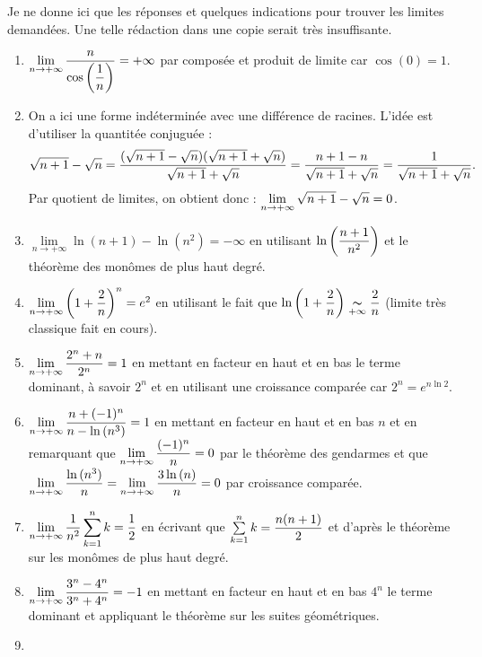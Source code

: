 \documentclass[a4paper, 11pt]{article}
\begin{document}
\begin{correction} \;
Je ne donne ici que les r\'eponses et quelques indications pour trouver les limites demand\'ees. Une telle r\'edaction dans une copie serait tr\`es insuffisante.
\begin{enumerate}
\item
$\lim \limits_{n\to +\infty}\displaystyle\frac{n}{\cos{\left(\displaystyle\frac{1}{n}  \right)}}=+\infty$ par compos\'ee et produit de limite car $\cos{(0)}=1$.
\item On a ici une forme ind\'etermin\'ee avec une diff\'erence de racines. L'id\'ee est d'utiliser la quantit\'ee conjugu\'ee :
$$\sqrt{n+1}-\sqrt{n} = \displaystyle \frac{(\sqrt{n+1}-\sqrt{n})(\sqrt{n+1}+\sqrt{n})}{\sqrt{n+1}+\sqrt{n}} = \frac{n+1-n}{\sqrt{n+1}+\sqrt{n}} = \frac{1}{\sqrt{n+1}+\sqrt{n}}.$$
Par quotient de limites, on obtient donc : $\lim \limits_{n\to +\infty}\displaystyle\sqrt{n+1}-\sqrt{n}=0$.
\item
$\lim \limits_{n\to +\infty}\ln{(n+1)}-\ln{(n^2)}=-\infty$ en utilisant $\ln{\left( \displaystyle\frac{n+1}{n^2} \right)}$ et le th\'eor\`{e}me des mon\^{o}mes de plus haut degr\'e.
\item
$\lim\limits_{n\to +\infty}\left(1+\displaystyle\frac{2}{n}\right)^n=e^2$ en utilisant le fait que $\ln{\left( 1+\displaystyle\frac{2}{n} \right)} \underset{+\infty}{\thicksim} \displaystyle\frac{2}{n}$ (limite tr\`{e}s classique fait en cours).
\item
$\lim \limits_{n\to +\infty}\displaystyle\frac{2^n+n}{2^n}=1$ en mettant en facteur en haut et en bas le terme dominant, \`a savoir $2^n$ et en utilisant une croissance compar\'ee car $2^n=e^{n\ln{2}}$. 
\item
$\lim \limits_{n\to +\infty}\displaystyle\frac{n+(-1)^n}{n-\ln{(n^3)}}=1$ en mettant en facteur en haut et en bas $n$ et en remarquant que $\lim\limits_{n\to +\infty} \displaystyle\frac{(-1)^n}{n}=0$ par le th\'eor\`eme des gendarmes et que $\lim\limits_{n\to +\infty} \displaystyle\frac{\ln{(n^3)}}{n}=\lim\limits_{n\to +\infty} \displaystyle\frac{3\ln{(n)}}{n}=0 $ par croissance compar\'ee.
\item
$\lim \limits_{n\to +\infty}\displaystyle\frac{1}{n^2}\sum\limits_{k=1}^n k= \displaystyle\frac{1}{2}$ en \'ecrivant que $\sum\limits_{k=1}^n k=\displaystyle\frac{n(n+1)}{2}$ et d'apr\`es le th\'eor\`eme sur les mon\^omes de plus haut degr\'e.
\item
$\lim \limits_{n\to +\infty}\displaystyle\frac{3^n-4^n}{3^n+4^n}=-1$ en mettant en facteur en haut et en bas $4^n$ le terme dominant et appliquant le th\'eor\`eme sur les suites g\'eom\'etriques.
\item

\end{enumerate}
\end{correction}
\end{document}
